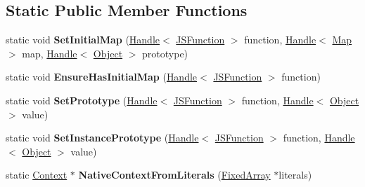 \subsection*{Static Public Member Functions}
\begin{DoxyCompactItemize}
\item 
\hypertarget{classv8_1_1internal_1_1_j_s_function_a48718f059b10957861aaecf82963da22}{}static void {\bfseries Set\+Initial\+Map} (\hyperlink{classv8_1_1internal_1_1_handle}{Handle}$<$ \hyperlink{classv8_1_1internal_1_1_j_s_function}{J\+S\+Function} $>$ function, \hyperlink{classv8_1_1internal_1_1_handle}{Handle}$<$ \hyperlink{classv8_1_1internal_1_1_map}{Map} $>$ map, \hyperlink{classv8_1_1internal_1_1_handle}{Handle}$<$ \hyperlink{classv8_1_1internal_1_1_object}{Object} $>$ prototype)\label{classv8_1_1internal_1_1_j_s_function_a48718f059b10957861aaecf82963da22}

\item 
\hypertarget{classv8_1_1internal_1_1_j_s_function_a5ede1c6b434cc020de4d8efdd57498d1}{}static void {\bfseries Ensure\+Has\+Initial\+Map} (\hyperlink{classv8_1_1internal_1_1_handle}{Handle}$<$ \hyperlink{classv8_1_1internal_1_1_j_s_function}{J\+S\+Function} $>$ function)\label{classv8_1_1internal_1_1_j_s_function_a5ede1c6b434cc020de4d8efdd57498d1}

\item 
\hypertarget{classv8_1_1internal_1_1_j_s_function_a8b10c267c842c7c0219ca747585905c0}{}static void {\bfseries Set\+Prototype} (\hyperlink{classv8_1_1internal_1_1_handle}{Handle}$<$ \hyperlink{classv8_1_1internal_1_1_j_s_function}{J\+S\+Function} $>$ function, \hyperlink{classv8_1_1internal_1_1_handle}{Handle}$<$ \hyperlink{classv8_1_1internal_1_1_object}{Object} $>$ value)\label{classv8_1_1internal_1_1_j_s_function_a8b10c267c842c7c0219ca747585905c0}

\item 
\hypertarget{classv8_1_1internal_1_1_j_s_function_a4fdcd36b2852be5144d3f8a2d358237c}{}static void {\bfseries Set\+Instance\+Prototype} (\hyperlink{classv8_1_1internal_1_1_handle}{Handle}$<$ \hyperlink{classv8_1_1internal_1_1_j_s_function}{J\+S\+Function} $>$ function, \hyperlink{classv8_1_1internal_1_1_handle}{Handle}$<$ \hyperlink{classv8_1_1internal_1_1_object}{Object} $>$ value)\label{classv8_1_1internal_1_1_j_s_function_a4fdcd36b2852be5144d3f8a2d358237c}

\item 
\hypertarget{classv8_1_1internal_1_1_j_s_function_ae8e5d6e32988b2f561faeca90d4c1727}{}static \hyperlink{classv8_1_1internal_1_1_context}{Context} $\ast$ {\bfseries Native\+Context\+From\+Literals} (\hyperlink{classv8_1_1internal_1_1_fixed_array}{Fixed\+Array} $\ast$literals)\label{classv8_1_1internal_1_1_j_s_function_ae8e5d6e32988b2f561faeca90d4c1727}

\end{DoxyCompactItemize}
